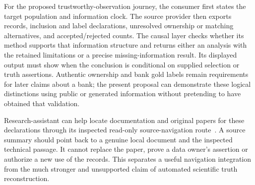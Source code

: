 For the proposed trustworthy-observation journey, the consumer first states
the target population and information clock. The source provider then exports
records, inclusion and label declarations, unresolved ownership or matching
alternatives, and accepted/rejected counts. The causal layer checks whether
its method supports that information structure and returns either an
analysis with the retained limitations or a precise missing-information
result. Its displayed output must show when the conclusion is conditional
on supplied selection or truth assertions. Authentic ownership and bank gold
labels remain requirements for later claims about a bank; the present
proposal can demonstrate these logical distinctions using public or generated
information without pretending to have obtained that validation.

Research-assistant can help locate documentation and original papers for
these declarations through its inspected read-only source-navigation route~\citep{v12_in_inventory}. A source summary should point back to a genuine local
document and the inspected technical passage. It cannot replace the paper,
prove a data owner's assertion or authorize a new use of the records. This
separates a useful navigation integration from the much stronger and
unsupported claim of automated scientific truth reconstruction.
